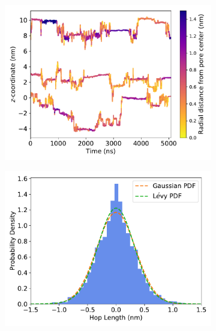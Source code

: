 \documentclass{article}
\begin{document}
  \begin{figure}
  \centering
  \begin{subfigure}{0.45\textwidth}
  \includegraphics[width=\textwidth]{GCL_trajectories.pdf}
  \caption{}\label{fig:GCL_solute_trajectories}
  \end{subfigure}
  \begin{subfigure}{0.45\textwidth}
  \includegraphics[width=\textwidth]{gaussian_levy_comparison_anomalous_GCL.pdf}
  \caption{}\label{fig:GCL_hop_distribution_comparison}
  \end{subfigure}

\end{figure}
\end{document}
